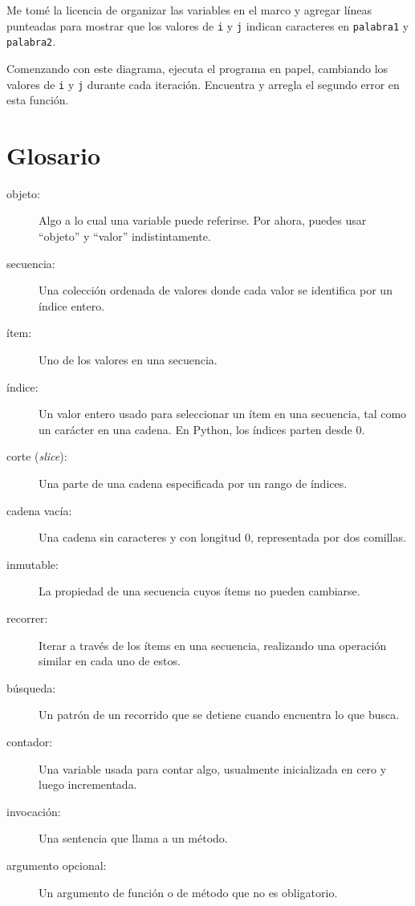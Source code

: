 \documentclass[10pt]{book}
\begin{document}
Me tomé la licencia de organizar las variables en el marco
y agregar líneas punteadas para mostrar que los valores de {\tt i} y
{\tt j} indican caracteres en {\tt palabra1} y {\tt palabra2}.

Comenzando con este diagrama, ejecuta el programa en papel, cambiando los
valores de {\tt i} y {\tt j} durante cada iteración.  Encuentra y arregla el
segundo error en esta función.
\label{isreverse}


\section{Glosario}

\begin{description}

\item[objeto:] Algo a lo cual una variable puede referirse.  Por ahora,
puedes usar ``objeto'' y ``valor'' indistintamente.

\item[secuencia:] Una colección ordenada de
valores donde cada valor se identifica por un índice entero.

\item[ítem:] Uno de los valores en una secuencia.

\item[índice:] Un valor entero usado para seleccionar un ítem en
una secuencia, tal como un carácter en una cadena.  En Python,
los índices parten desde 0.

\item[corte ({\em slice}):] Una parte de una cadena especificada por un rango de índices.

\item[cadena vacía:] Una cadena sin caracteres y con longitud 0, representada
por dos comillas.

\item[inmutable:] La propiedad de una secuencia cuyos ítems no pueden
cambiarse.

\item[recorrer:] Iterar a través de los ítems en una secuencia,
realizando una operación similar en cada uno de estos.

\item[búsqueda:] Un patrón de un recorrido que se detiene
cuando encuentra lo que busca.

\item[contador:] Una variable usada para contar algo, usualmente inicializada
en cero y luego incrementada.

\item[invocación:] Una sentencia que llama a un método.

\item[argumento opcional:] Un argumento de función o de método que no es
obligatorio.

\end{description}
\end{document}
